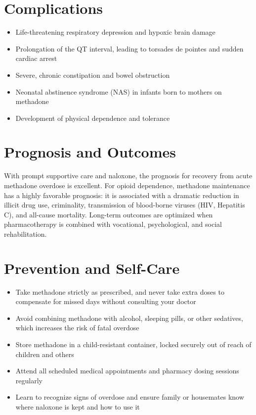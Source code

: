 \section*{Complications}
\begin{itemize}
    \item Life-threatening respiratory depression and hypoxic brain damage
    \item Prolongation of the QT interval, leading to torsades de pointes and sudden cardiac arrest
    \item Severe, chronic constipation and bowel obstruction
    \item Neonatal abstinence syndrome (NAS) in infants born to mothers on methadone
    \item Development of physical dependence and tolerance
\end{itemize}

\section*{Prognosis and Outcomes}
With prompt supportive care and naloxone, the prognosis for recovery from acute methadone overdose is excellent. For opioid dependence, methadone maintenance has a highly favorable prognosis: it is associated with a dramatic reduction in illicit drug use, criminality, transmission of blood-borne viruses (HIV, Hepatitis C), and all-cause mortality. Long-term outcomes are optimized when pharmacotherapy is combined with vocational, psychological, and social rehabilitation.

\section*{Prevention and Self-Care}
\begin{itemize}
    \item Take methadone strictly as prescribed, and never take extra doses to compensate for missed days without consulting your doctor
    \item Avoid combining methadone with alcohol, sleeping pills, or other sedatives, which increases the risk of fatal overdose
    \item Store methadone in a child-resistant container, locked securely out of reach of children and others
    \item Attend all scheduled medical appointments and pharmacy dosing sessions regularly
    \item Learn to recognize signs of overdose and ensure family or housemates know where naloxone is kept and how to use it
\end{itemize}


